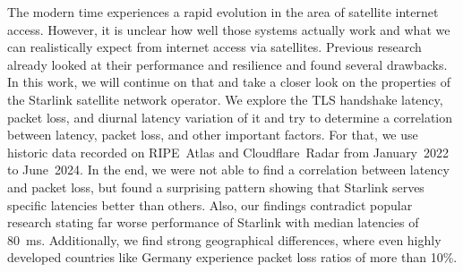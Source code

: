 The modern time experiences a rapid evolution in the area of satellite internet
access. However, it is unclear how well those systems actually work and what we
can realistically expect from internet access via satellites. Previous research
already looked at their performance and resilience and found several drawbacks.
In this work, we will continue on that and take a closer look on the properties
of the Starlink satellite network operator. We explore the TLS handshake
latency, packet loss, and diurnal latency variation of it and try to determine
a correlation between latency, packet loss, and other important factors. For
that, we use historic data recorded on RIPE~Atlas and Cloudflare~Radar from
January~2022 to June~2024. In the end, we were not able to find a correlation
between latency and packet loss, but found a surprising pattern showing that
Starlink serves specific latencies better than others. Also, our findings
contradict popular research stating far worse performance of Starlink with
median latencies of 80~ms. Additionally, we find strong geographical
differences, where even highly developed countries like Germany experience
packet loss ratios of more than 10\%.
